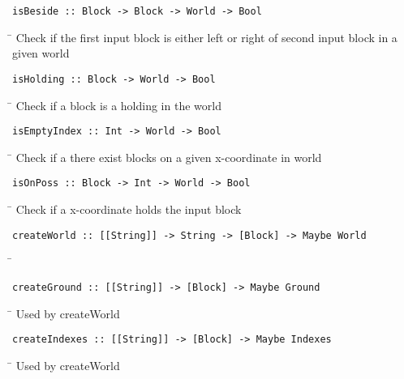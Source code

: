 \begin{verbatim}
isBeside :: Block -> Block -> World -> Bool
\end{verbatim}
\begin{tabbing}
\hspace*{1cm}\= \kill
\> Check if the first input block is either left or right of second input block in a \\
\> given world
\end{tabbing}
\begin{verbatim}
isHolding :: Block -> World -> Bool
\end{verbatim}
\begin{tabbing}
\hspace*{1cm}\= \kill
\> Check if a block is a holding in the world
\end{tabbing}
\begin{verbatim}
isEmptyIndex :: Int -> World -> Bool
\end{verbatim}
\begin{tabbing}
\hspace*{1cm}\= \kill
\> Check if a there exist blocks on a given x-coordinate in world
\end{tabbing}
\begin{verbatim}
isOnPoss :: Block -> Int -> World -> Bool
\end{verbatim}
\begin{tabbing}
\hspace*{1cm}\= \kill
\> Check if a x-coordinate holds the input block
\end{tabbing}
\begin{verbatim}
createWorld :: [[String]] -> String -> [Block] -> Maybe World
\end{verbatim}
\begin{tabbing}
\hspace*{1cm}\= \kill
\> 
\end{tabbing}
\begin{verbatim}
createGround :: [[String]] -> [Block] -> Maybe Ground
\end{verbatim}
\begin{tabbing}
\hspace*{1cm}\= \kill
\> Used by createWorld
\end{tabbing}
\begin{verbatim}
createIndexes :: [[String]] -> [Block] -> Maybe Indexes
\end{verbatim}
\begin{tabbing}
\hspace*{1cm}\= \kill
\> Used by createWorld
\end{tabbing}
